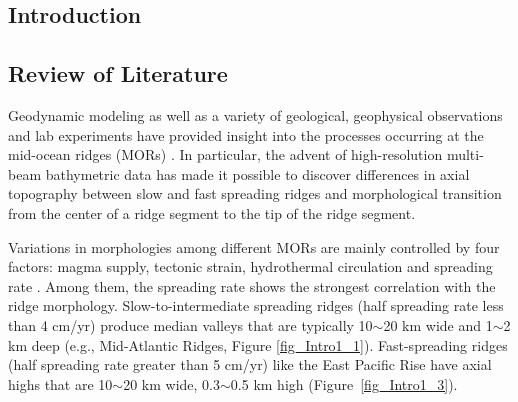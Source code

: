 \documentclass[draft,gc]{agutex}
\begin{document}
%
%

%

\begin{article}

%
%

\section{Introduction}
\subsection{Review of Literature}
Geodynamic modeling as well as a variety of geological, geophysical observations and lab experiments have provided insight into the processes occurring at the mid-ocean ridges (MORs) \citep[e.g.,][]{Tucholke1994,Blackman2004,Behn2006,Behn2008,Ito2008,Baines2008,Escartin2008,Canales2008,Dick2008,Dannowski2010,Olive2010,Reston2011a,Reston2011b}. In particular, the advent of high-resolution multi-beam bathymetric data has made it possible to discover differences in axial topography between slow and fast spreading ridges and morphological transition from the center of a ridge segment to the tip of the ridge segment.

Variations in morphologies among different MORs are mainly controlled by four factors: magma supply, tectonic strain, hydrothermal circulation and spreading rate \citep{Fowler2004}. Among them, the spreading rate shows the strongest correlation with the ridge morphology. Slow-to-intermediate spreading ridges (half spreading rate less than 4 cm/yr) produce median valleys that are typically 10$\sim$20 km wide and 1$\sim$2 km deep (e.g., Mid-Atlantic Ridges, Figure \ref{fig_Intro1_1}). Fast-spreading ridges (half spreading rate greater than 5 cm/yr) like the East Pacific Rise have axial highs that are 10$\sim$20 km wide, 0.3$\sim$0.5 km high (Figure~\ref{fig_Intro1_3}).


\end{article}
\end{document}
